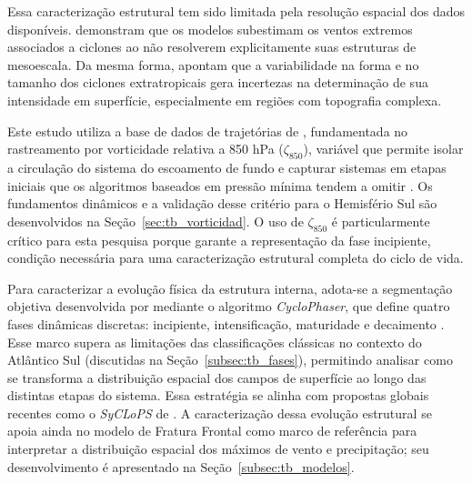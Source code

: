 Essa caracterização estrutural tem sido limitada pela resolução espacial dos dados disponíveis. \citet{priestley2022improved} demonstram que os modelos subestimam os ventos extremos associados a ciclones ao não resolverem explicitamente suas estruturas de mesoescala. Da mesma forma, \citet{neu2013intercomparison} apontam que a variabilidade na forma e no tamanho dos ciclones extratropicais gera incertezas na determinação de sua intensidade em superfície, especialmente em regiões com topografia complexa.


Este estudo utiliza a base de dados de trajetórias de \citet{coutodesouza2024new}, fundamentada no rastreamento por vorticidade relativa a 850 hPa ($\zeta_{850}$), variável que permite isolar a circulação do sistema do escoamento de fundo e capturar sistemas em etapas iniciais que os algoritmos baseados em pressão mínima tendem a omitir \citep{sinclair1994objective,sinclair1997objective}.
Os fundamentos dinâmicos e a validação desse critério para o Hemisfério Sul são desenvolvidos na Seção~\ref{sec:tb_vorticidad}. O uso de $\zeta_{850}$ é particularmente crítico para esta pesquisa porque garante a representação da fase incipiente, condição necessária para uma caracterização estrutural completa do ciclo de vida.

Para caracterizar a evolução física da estrutura interna, adota-se a segmentação objetiva desenvolvida por \citet{coutodesouza2024new} mediante o algoritmo \textit{CycloPhaser}, que define quatro fases dinâmicas discretas: incipiente, intensificação, maturidade e decaimento \citep{deSouza2025CycloPhaser}.
Esse marco supera as limitações das classificações clássicas no contexto do Atlântico Sul (discutidas na Seção~\ref{subsec:tb_fases}), permitindo analisar como se transforma a distribuição espacial dos campos de superfície ao longo das distintas etapas do sistema. Essa estratégia se alinha com propostas globais recentes como o \textit{SyCLoPS} de \citet{han2025system}.
A caracterização dessa evolução estrutural se apoia ainda no modelo de Fratura Frontal \citep{shapiro1990life,shapiro1999bridge} como marco de referência para interpretar a distribuição espacial dos máximos de vento e precipitação; seu desenvolvimento é apresentado na Seção~\ref{subsec:tb_modelos}.

